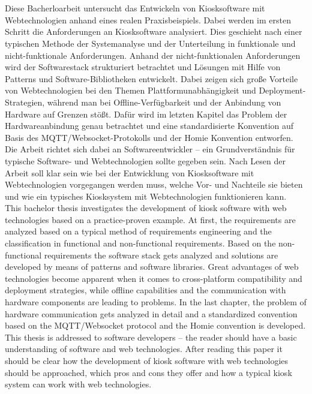 \chapter{\abstractname}

Diese Bacherloarbeit untersucht das Entwickeln von Kiosksoftware mit Webtechnologien
anhand eines realen Praxisbeispiels. Dabei werden im ersten Schritt die Anforderungen
an Kiosksoftware analysiert. Dies geschieht nach einer typischen Methode der Systemanalyse
und der Unterteilung in funktionale und nicht-funktionale Anforderungen. 
Anhand der nicht-funktionalen Anforderungen
wird der Softwarestack strukturiert betrachtet und Lösungen mit Hilfe von Patterns und 
Software-Bibliotheken entwickelt. 
Dabei zeigen sich große Vorteile von Webtechnologien bei den Themen
Plattformunabhängigkeit und Deployment-Strategien, während man bei Offline-Verfügbarkeit und der
Anbindung von Hardware auf Grenzen stößt. Dafür wird im letzten Kapitel das Problem der
Hardwareanbindung genau betrachtet und eine standardisierte Konvention auf
Basis des MQTT/Websocket-Protokolls und der Homie Konvention entworfen.\\
Die Arbeit richtet sich dabei an Softwareentwickler -- ein Grundverständnis für typische 
Software- und Webtechnologien sollte gegeben sein. Nach Lesen der Arbeit soll klar sein
wie bei der Entwicklung von Kiosksoftware mit Webtechnologien vorgegangen werden muss, welche
Vor- und Nachteile sie bieten und wie ein typisches Kiosksystem mit Webtechnologien funktionieren
kann. \\

This bachelor thesis investigates the development of kiosk software with web technologies based
on a practice-proven example. At first, the requirements are analyzed based on a typical
method of requirements engineering and the classification in functional and non-functional requirements. 
Based on the non-functional requirements the software stack gets analyzed and solutions are 
developed by means of patterns and software libraries. Great advantages of web technologies
become apparent when it comes to cross-platform compatibility and deployment strategies, while
offline capabilities and the communication with hardware components are leading to problems. 
In the last chapter, the problem of hardware communication gets analyzed in detail
and a standardized convention based on the MQTT/Websocket protocol and the Homie convention 
is developed.\\
This thesis is addressed to software developers -- the reader should have a basic understanding of
software and web technologies. After reading this paper it should be clear how the development of
kiosk software with web technologies should be approached, which pros and cons they offer and
how a typical kiosk system can work with web technologies. 

